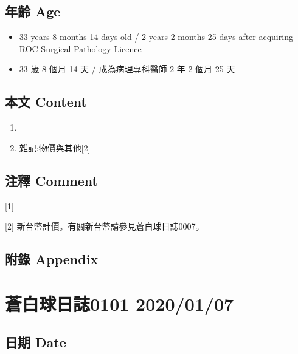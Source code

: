 \documentclass[a5paper, 12pt
]{book}
\providecommand{\tightlist}{%
  \setlength{\itemsep}{0pt}\setlength{\parskip}{0pt}}
\begin{document}
\hypertarget{ux5e74ux9f61-age-36}{%
\subsection{年齡 Age}\label{ux5e74ux9f61-age-36}}

\begin{itemize}
\tightlist
\item
  33 years 8 months 14 days old / 2 years 2 months 25 days after
  acquiring ROC Surgical Pathology Licence
\item
  33 歲 8 個月 14 天 / 成為病理專科醫師 2 年 2 個月 25 天
\end{itemize}

\hypertarget{ux672cux6587-content-36}{%
\subsection{本文 Content}\label{ux672cux6587-content-36}}

\begin{enumerate}
\def\labelenumi{\arabic{enumi}.}
\item
\item
  雜記:物價與其他{[}2{]}
\end{enumerate}

\hypertarget{ux6ce8ux91cb-comment-35}{%
\subsection{注釋 Comment}\label{ux6ce8ux91cb-comment-35}}

{[}1{]}

{[}2{]} 新台幣計價。有關新台幣請參見蒼白球日誌0007。

\hypertarget{ux9644ux9304-appendix-36}{%
\subsection{附錄 Appendix}\label{ux9644ux9304-appendix-36}}

\hypertarget{ux84bcux767dux7403ux65e5ux8a8c0101-20200107}{%
\section{蒼白球日誌0101
2020/01/07}\label{ux84bcux767dux7403ux65e5ux8a8c0101-20200107}}

\hypertarget{ux65e5ux671f-date-37}{%
\subsection{日期 Date}\label{ux65e5ux671f-date-37}}
\end{document}
